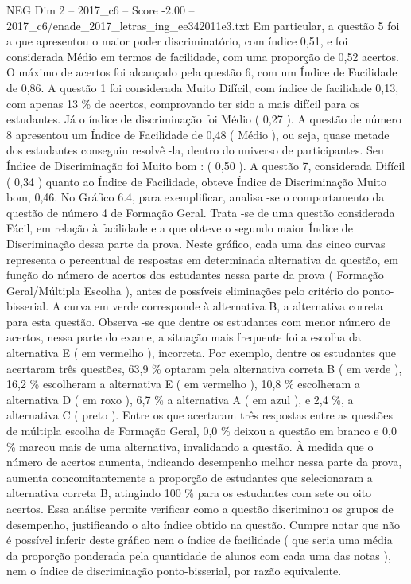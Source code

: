 \begin{textsample}{NEG Dim 2 – 2017\_c6 – Score -2.00 – 2017\_c6/enade\_2017\_letras\_ing\_ee342011e3.txt}
Em particular, a questão 5 foi a que apresentou o maior poder discriminatório, com índice 0,51, e foi considerada Médio em termos de facilidade, com uma proporção de 0,52 acertos.
O máximo de acertos foi alcançado pela questão 6, com um Índice de Facilidade de 0,86.
A questão 1 foi considerada Muito Difícil, com índice de facilidade 0,13, com apenas 13 \% de acertos, comprovando ter sido a mais difícil para os estudantes.
Já o índice de discriminação foi Médio ( 0,27 ).
A questão de número 8 apresentou um Índice de Facilidade de 0,48 ( Médio ), ou seja, quase metade dos estudantes conseguiu resolvê -la, dentro do universo de participantes.
Seu Índice de Discriminação foi Muito bom : ( 0,50 ).
A questão 7, considerada Difícil ( 0,34 ) quanto ao Índice de Facilidade, obteve Índice de Discriminação Muito bom, 0,46.
No Gráfico 6.4, para exemplificar, analisa -se o comportamento da questão de número 4 de Formação Geral.
Trata -se de uma questão considerada Fácil, em relação à facilidade e a que obteve o segundo maior Índice de Discriminação dessa parte da prova.
Neste gráfico, cada uma das cinco curvas representa o percentual de respostas em determinada alternativa da questão, em função do número de acertos dos estudantes nessa parte da prova ( Formação Geral/Múltipla Escolha ), antes de possíveis eliminações pelo critério do ponto-bisserial.
A curva em verde corresponde à alternativa B, a alternativa correta para esta questão.
Observa -se que dentre os estudantes com menor número de acertos, nessa parte do exame, a situação mais frequente foi a escolha da alternativa E ( em vermelho ), incorreta.
Por exemplo, dentre os estudantes que acertaram três questões, 63,9 \% optaram pela alternativa correta B ( em verde ), 16,2 \% escolheram a alternativa E ( em vermelho ), 10,8 \% escolheram a alternativa D ( em roxo ), 6,7 \% a alternativa A ( em azul ), e 2,4 \%, a alternativa C ( preto ).
Entre os que acertaram três respostas entre as questões de múltipla escolha de Formação Geral, 0,0 \% deixou a questão em branco e 0,0 \% marcou mais de uma alternativa, invalidando a questão.
À medida que o número de acertos aumenta, indicando desempenho melhor nessa parte da prova, aumenta concomitantemente a proporção de estudantes que selecionaram a alternativa correta B, atingindo 100 \% para os estudantes com sete ou oito acertos.
Essa análise permite verificar como a questão discriminou os grupos de desempenho, justificando o alto índice obtido na questão.
Cumpre notar que não é possível inferir deste gráfico nem o índice de facilidade ( que seria uma média da proporção ponderada pela quantidade de alunos com cada uma das notas ), nem o índice de discriminação ponto-bisserial, por razão equivalente.

\end{textsample}
